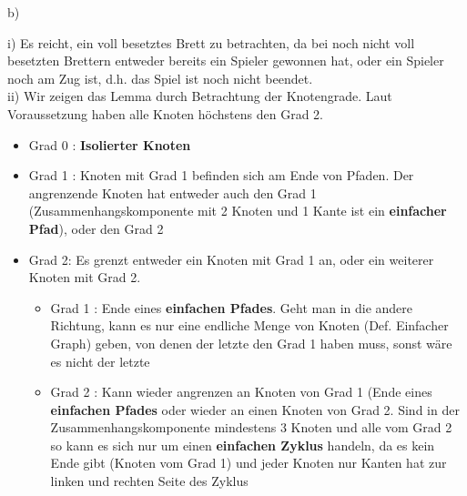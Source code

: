 \documentclass{scrartcl}
\begin{document}
b)

i) Es reicht, ein voll besetztes Brett zu betrachten, da bei noch nicht voll besetzten Brettern entweder
bereits ein Spieler gewonnen hat, oder ein Spieler noch am Zug ist, d.h. das Spiel ist noch nicht beendet.\\

ii) Wir zeigen das Lemma durch Betrachtung der Knotengrade. Laut Voraussetzung haben alle Knoten höchstens
den Grad 2.

\begin{itemize}
\item{Grad 0 : \textbf{Isolierter Knoten}}
\item{Grad 1 : Knoten mit Grad 1 befinden sich am Ende von Pfaden. Der angrenzende Knoten hat entweder auch
den Grad 1 (Zusammenhangskomponente mit 2 Knoten und 1 Kante ist ein \textbf{einfacher Pfad}), oder den
Grad 2}
\item{Grad 2: Es grenzt entweder ein Knoten mit Grad 1 an, oder ein weiterer Knoten mit Grad 2.}
\begin{itemize}
\item{Grad 1 : Ende eines \textbf{einfachen Pfades}. Geht man in die andere Richtung, kann es nur eine
endliche Menge von Knoten (Def. Einfacher Graph) geben, von denen der letzte den Grad 1 haben muss, sonst
wäre es nicht der letzte}
\item{Grad 2 : Kann wieder angrenzen an Knoten von Grad 1 (Ende eines \textbf{einfachen Pfades} oder wieder
an einen Knoten von Grad 2. Sind in der Zusammenhangskomponente mindestens 3 Knoten und alle vom Grad 2 so
kann es sich nur um einen \textbf{einfachen Zyklus} handeln, da es kein Ende gibt (Knoten vom Grad 1) und
jeder Knoten nur Kanten hat zur linken und rechten Seite des Zyklus} 

\end{itemize}
\end{itemize}
\end{document}
